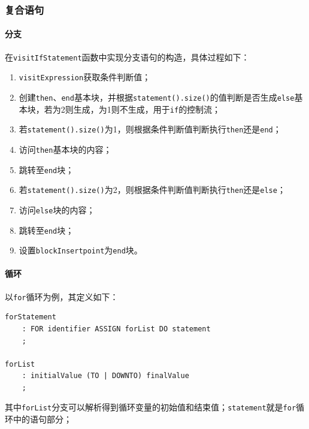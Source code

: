 \documentclass[lang=cn,11pt,a4paper,cite=authornum]{paper}
\begin{document}
\subsubsection{复合语句}

\paragraph{分支} 在\texttt{visitIfStatement}函数中实现分支语句的构造，具体过程如下：

\begin{enumerate}
    \item \texttt{visitExpression}获取条件判断值；
    \item 创建\texttt{then}、\texttt{end}基本块，并根据\texttt{statement().size()}的值判断是否生成\texttt{else}基本块，若为2则生成，为1则不生成，用于\texttt{if}的控制流；
    \item 若\texttt{statement().size()}为1，则根据条件判断值判断执行\texttt{then}还是\texttt{end}；
    \item 访问\texttt{then}基本块的内容；
    \item 跳转至\texttt{end}块；
    \item 若\texttt{statement().size()}为2，则根据条件判断值判断执行\texttt{then}还是\texttt{else}；
    \item 访问\texttt{else}块的内容；
    \item 跳转至\texttt{end}块；
    \item 设置\texttt{blockInsertpoint}为\texttt{end}块。
\end{enumerate}

\paragraph{循环} 以\texttt{for}循环为例，其定义如下：

\begin{code}
\begin{verbatim}
forStatement
    : FOR identifier ASSIGN forList DO statement
    ;
 
forList
    : initialValue (TO | DOWNTO) finalValue
    ;
\end{verbatim}
\end{code}

其中\texttt{forList}分支可以解析得到循环变量的初始值和结束值；\texttt{statement}就是\texttt{for}循环中的语句部分；
\end{document}
